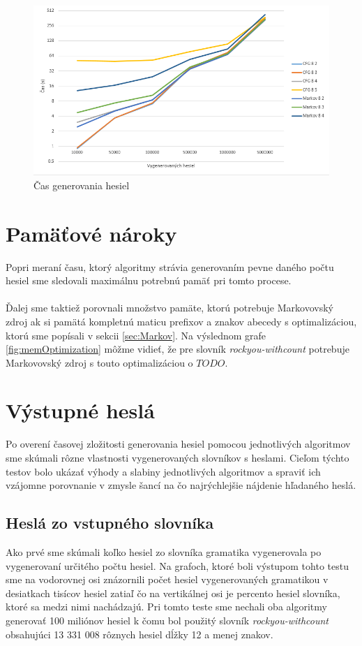 \begin{figure}[ht]
    \centering
    \includegraphics[width=1\textwidth]{generateTime}
    \caption{Čas generovania hesiel}
    \label{fig:generateTime}
\end{figure}

\section{Pamäťové nároky}
Popri meraní času, ktorý algoritmy strávia generovaním pevne daného počtu hesiel sme sledovali maximálnu potrebnú pamäť pri tomto procese.

\paragraph{}
Ďalej sme taktiež porovnali množstvo pamäte, ktorú potrebuje Markovovský zdroj ak si pamätá kompletnú maticu prefixov a znakov abecedy s optimalizáciou, ktorú sme popísali v sekcii \ref{sec:Markov}. Na výslednom grafe \ref{fig:memOptimization} môžme vidieť, že pre slovník \emph{rockyou-withcount} potrebuje Markovovský zdroj s touto optimalizáciou o \(TODO\).

\section{Výstupné heslá}
\label{sec:pass}
Po overení časovej zložitosti generovania hesiel pomocou jednotlivých algoritmov sme skúmali rôzne vlastnosti vygenerovaných slovníkov s heslami. Cieľom týchto testov bolo ukázať výhody a slabiny jednotlivých algoritmov a spraviť ich vzájomne porovnanie v zmysle šancí na čo najrýchlejšie nájdenie hľadaného heslá.

\subsection{Heslá zo vstupného slovníka}
Ako prvé sme skúmali koľko hesiel zo slovníka gramatika vygenerovala po vygenerovaní určitého počtu hesiel. Na grafoch, ktoré boli výstupom tohto testu sme na vodorovnej osi znázornili počet hesiel vygenerovaných gramatikou v desiatkach tisícov hesiel zatiaľ čo na vertikálnej osi je percento hesiel slovníka, ktoré sa medzi nimi nachádzajú. Pri tomto teste sme nechali oba algoritmy generovať 100 miliónov hesiel k čomu bol použitý slovník \emph{rockyou-withcount} obsahujúci 13 331 008 rôznych hesiel dĺžky 12 a menej znakov.

